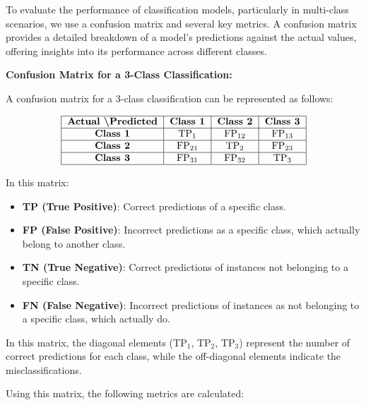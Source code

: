 To evaluate the performance of classification models, particularly in multi-class scenarios, we use a confusion matrix and several key metrics. A confusion matrix provides a detailed breakdown of a model's predictions against the actual values, offering insights into its performance across different classes.

\textbf{Confusion Matrix for a 3-Class Classification:}

A confusion matrix for a 3-class classification can be represented as follows:

\[
\begin{tabular}{|c|c|c|c|}
\hline
\textbf{Actual \textbackslash Predicted} & \textbf{Class 1} & \textbf{Class 2} & \textbf{Class 3} \\
\hline
\textbf{Class 1} & $\text{TP}_{1}$ & $\text{FP}_{12}$ & $\text{FP}_{13}$ \\
\hline
\textbf{Class 2} & $\text{FP}_{21}$ & $\text{TP}_{2}$ & $\text{FP}_{23}$ \\
\hline
\textbf{Class 3} & $\text{FP}_{31}$ & $\text{FP}_{32}$ & $\text{TP}_{3}$ \\
\hline
\end{tabular}
\]

In this matrix:
\begin{itemize}
    \item \textbf{TP (True Positive)}: Correct predictions of a specific class.
    \item \textbf{FP (False Positive)}: Incorrect predictions as a specific class, which actually belong to another class.
    \item \textbf{TN (True Negative)}: Correct predictions of instances not belonging to a specific class.
    \item \textbf{FN (False Negative)}: Incorrect predictions of instances as not belonging to a specific class, which actually do.
\end{itemize}

In this matrix, the diagonal elements ($\text{TP}_{1}$, $\text{TP}_{2}$, $\text{TP}_{3}$) represent the number of correct predictions for each class, while the off-diagonal elements indicate the misclassifications.

Using this matrix, the following metrics are calculated:

